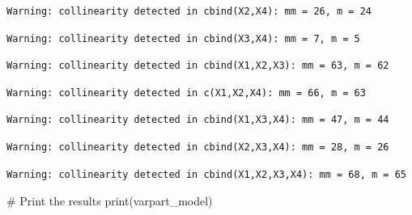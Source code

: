 \documentclass[
  letterpaper,
  DIV=11,
  numbers=noendperiod]{scrartcl}
\newenvironment{Shaded}{\begin{snugshade}}{\end{snugshade}}
\newcommand{\CommentTok}[1]{\textcolor[rgb]{0.37,0.37,0.37}{#1}}
\newcommand{\FunctionTok}[1]{\textcolor[rgb]{0.28,0.35,0.67}{#1}}
\newcommand{\NormalTok}[1]{\textcolor[rgb]{0.00,0.23,0.31}{#1}}
\begin{document}
\begin{verbatim}
Warning: collinearity detected in cbind(X2,X4): mm = 26, m = 24
\end{verbatim}

\begin{verbatim}
Warning: collinearity detected in cbind(X3,X4): mm = 7, m = 5
\end{verbatim}

\begin{verbatim}
Warning: collinearity detected in cbind(X1,X2,X3): mm = 63, m = 62
\end{verbatim}

\begin{verbatim}
Warning: collinearity detected in c(X1,X2,X4): mm = 66, m = 63
\end{verbatim}

\begin{verbatim}
Warning: collinearity detected in cbind(X1,X3,X4): mm = 47, m = 44
\end{verbatim}

\begin{verbatim}
Warning: collinearity detected in cbind(X2,X3,X4): mm = 28, m = 26
\end{verbatim}

\begin{verbatim}
Warning: collinearity detected in cbind(X1,X2,X3,X4): mm = 68, m = 65
\end{verbatim}

\begin{Shaded}
\begin{Highlighting}[]
\CommentTok{\# Print the results}
\FunctionTok{print}\NormalTok{(varpart\_model)}
\end{Highlighting}
\end{Shaded}
\end{document}
